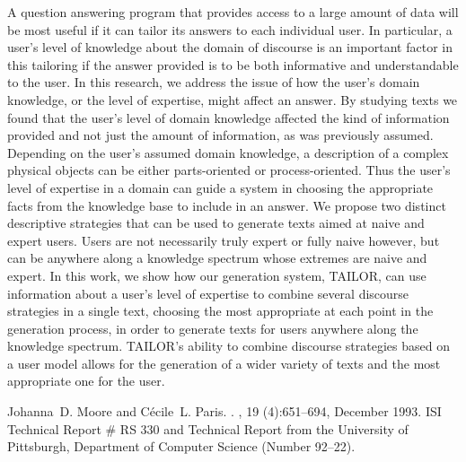\begin{thebibliography}{10}
{\leftskip=0.1in\rightskip=0.1in\begin{small}\par{}A
  question answering program that provides access to a large amount of data
  will be most useful if it can tailor its answers to each individual user. In
  particular, a user's level of knowledge about the domain of discourse is an
  important factor in this tailoring if the answer provided is to be both
  informative and understandable to the user. In this research, we address the
  issue of how the user's domain knowledge, or the level of expertise, might
  affect an answer. By studying texts we found that the user's level of domain
  knowledge affected the kind of information provided and not just the amount
  of information, as was previously assumed. Depending on the user's assumed
  domain knowledge, a description of a complex physical objects can be either
  parts-oriented or process-oriented. Thus the user's level of expertise in a
  domain can guide a system in choosing the appropriate facts from the
  knowledge base to include in an answer. We propose two distinct descriptive
  strategies that can be used to generate texts aimed at naive and expert
  users. Users are not necessarily truly expert or fully naive however, but can
  be anywhere along a knowledge spectrum whose extremes are naive and expert.
  In this work, we show how our generation system, TAILOR, can use information
  about a user's level of expertise to combine several discourse strategies in
  a single text, choosing the most appropriate at each point in the generation
  process, in order to generate texts for users anywhere along the knowledge
  spectrum. TAILOR's ability to combine discourse strategies based on a user
  model allows for the generation of a wider variety of texts and the most
  appropriate one for the user.\end{small}\par}
\noindent\hspace*{\itemindent}{\leftskip=0.1in\rightskip=0.1in\hrulefill}

Johanna~D. Moore and C\'{e}cile~L. Paris.
.
, 19 (4):651--694, December 1993.
\newblock ISI Technical Report \# RS 330 and Technical Report from the
  University of Pittsburgh, Department of Computer Science (Number 92--22).


\end{thebibliography}
